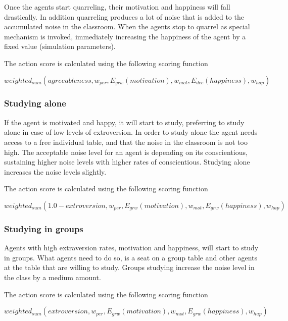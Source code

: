 Once the agents start quarreling, their motivation and happiness will fall drastically.
In addition quarreling produces a lot of noise that is added to the accumulated
noise in the classroom.
When the agents stop to quarrel as special mechanism is invoked, immediately
increasing the happiness of the agent by a fixed value (simulation parameters).

The action score is calculated using the following scoring function

\begin{equation}
    weighted_{sum}(agreeableness, w_{per}, E_{grw}(motivation), w_{mot}, E_{dec}(happiness), w_{hap})
\end{equation}


\subsubsection{Studying alone}
If the agent is motivated and happy, it will start to study, preferring
to study alone in case of low levels of extroversion. In order to study alone the
agent needs access to a free individual table, and that the noise in the classroom
is not too high. The acceptable noise level for an agent is depending on its
conscientious, sustaining higher noise levels with higher rates of conscientious.
Studying alone increases the noise levels slightly.

The action score is calculated using the following scoring function

\begin{equation}
    weighted_{sum}(1.0 - extroversion, w_{per}, E_{grw}(motivation), w_{mot}, E_{grw}(happiness), w_{hap})
\end{equation}

\subsubsection{Studying in groups}
Agents with high extraversion rates, motivation and happiness, will start to study
in groups. What agents need to do so, is a seat on a group table and other agents
at the table that are willing to study. Groups studying increase the noise level
in the class by a medium amount.

The action score is calculated using the following scoring function

\begin{equation}
    weighted_{sum}(extroversion, w_{per}, E_{grw}(motivation), w_{mot}, E_{grw}(happiness), w_{hap})
\end{equation}
